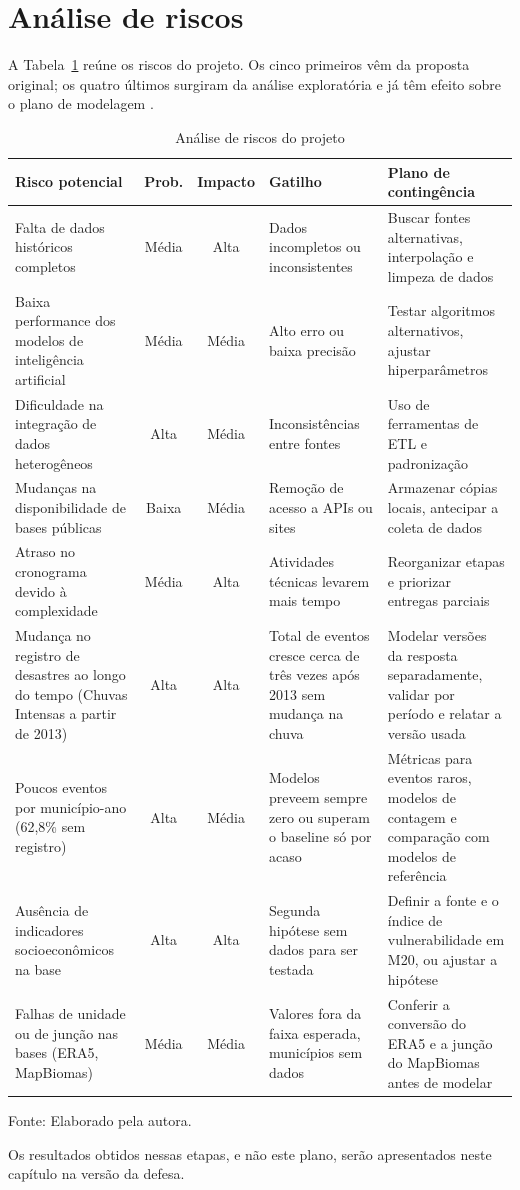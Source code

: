 \section{Análise de riscos}
\label{sec:res-riscos}

A Tabela~\ref{tab:riscos} reúne os riscos do projeto. Os cinco primeiros vêm da proposta original; os quatro últimos surgiram da análise exploratória e já têm efeito sobre o plano de modelagem .

\begin{table}[htbp]
\centering
\caption{Análise de riscos do projeto}
\label{tab:riscos}
\small
\begin{tabular}{p{3.3cm}cc p{3.8cm}p{4.6cm}}
\hline
Risco potencial & Prob. & Impacto & Gatilho & Plano de contingência \\
\hline
Falta de dados históricos completos & Média & Alta & Dados incompletos ou inconsistentes & Buscar fontes alternativas, interpolação e limpeza de dados \\
Baixa performance dos modelos de inteligência artificial & Média & Média & Alto erro ou baixa precisão & Testar algoritmos alternativos, ajustar hiperparâmetros \\
Dificuldade na integração de dados heterogêneos & Alta & Média & Inconsistências entre fontes & Uso de ferramentas de ETL e padronização \\
Mudanças na disponibilidade de bases públicas & Baixa & Média & Remoção de acesso a APIs ou sites & Armazenar cópias locais, antecipar a coleta de dados \\
Atraso no cronograma devido à complexidade & Média & Alta & Atividades técnicas levarem mais tempo & Reorganizar etapas e priorizar entregas parciais \\
Mudança no registro de desastres ao longo do tempo (Chuvas Intensas a partir de 2013) & Alta & Alta & Total de eventos cresce cerca de três vezes após 2013 sem mudança na chuva & Modelar versões da resposta separadamente, validar por período e relatar a versão usada \\
Poucos eventos por município-ano (62,8\% sem registro) & Alta & Média & Modelos preveem sempre zero ou superam o baseline só por acaso & Métricas para eventos raros, modelos de contagem e comparação com modelos de referência \\
Ausência de indicadores socioeconômicos na base & Alta & Alta & Segunda hipótese sem dados para ser testada & Definir a fonte e o índice de vulnerabilidade em M20, ou ajustar a hipótese \\
Falhas de unidade ou de junção nas bases (ERA5, MapBiomas) & Média & Média & Valores fora da faixa esperada, municípios sem dados & Conferir a conversão do ERA5 e a junção do MapBiomas antes de modelar \\
\hline
\end{tabular}
\par\small Fonte: Elaborado pela autora.
\end{table}

Os resultados obtidos nessas etapas, e não este plano, serão apresentados neste capítulo na versão da defesa.